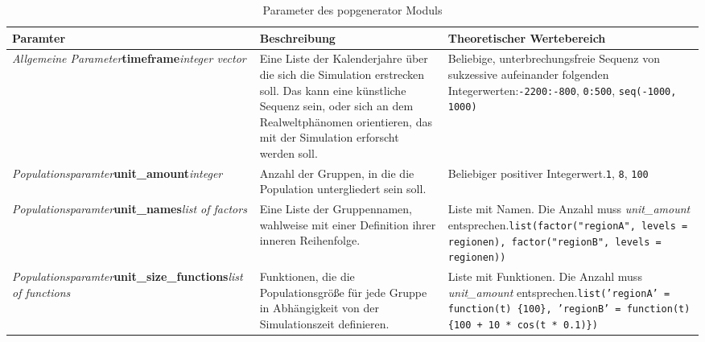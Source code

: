 \documentclass[openany,twoside,twocolumn]{book}
\begin{document}
\begin{table*}

\caption{\label{tab:param-popgenerator}Parameter des popgenerator Moduls}
\centering
\fontsize{8}{10}\selectfont
\begin{tabu} to 
\toprule
Paramter & Beschreibung & Theoretischer Wertebereich\\
\midrule
\textit{Allgemeine Parameter}\newline \textbf{timeframe}\newline \textit{integer vector} & Eine Liste der Kalenderjahre über die sich die Simulation erstrecken soll. Das kann eine künstliche Sequenz sein, oder sich an dem Realweltphänomen orientieren, das mit der Simulation erforscht werden soll. & Beliebige, unterbrechungsfreie Sequenz von sukzessive aufeinander folgenden Integerwerten:\newline     \texttt{-2200:-800}, \texttt{0:500}, \texttt{seq(-1000, 1000)}\\
\addlinespace \hline \addlinespace
\textit{Populationsparamter}\newline \textbf{unit\_amount}\newline \textit{integer} & Anzahl der Gruppen, in die die Population untergliedert sein soll. & Beliebiger positiver Integerwert.\newline     \texttt{1}, \texttt{8}, \texttt{100}\\
\addlinespace \hline \addlinespace
\textit{Populationsparamter}\newline \textbf{unit\_names}\newline \textit{list of factors} & Eine Liste der Gruppennamen, wahlweise mit einer Definition ihrer inneren Reihenfolge. & Liste mit Namen. Die Anzahl muss \textit{unit\_amount} entsprechen.\newline     \texttt{list(factor("regionA", levels = regionen), factor("regionB", levels = regionen))}\\
\addlinespace \hline \addlinespace
\textit{Populationsparamter}\newline \textbf{unit\_size\_functions}\newline \textit{list of functions} & Funktionen, die die Populationsgröße für jede Gruppe in Abhängigkeit von der Simulationszeit definieren. & Liste mit Funktionen. Die Anzahl muss \textit{unit\_amount} entsprechen.\newline     \texttt{list('regionA' = function(t) \{100\}, 'regionB' = function(t) \{100 + 10 * cos(t * 0.1)\})}\\

\end{tabu}
\end{table*}
\end{document}
